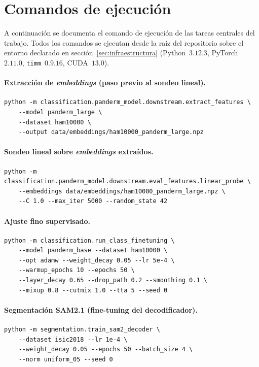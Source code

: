 \section{Comandos de ejecución}
\label{sec:anexoa-comandos}

A continuación se documenta el comando de ejecución de las
tareas centrales del trabajo. Todos los comandos se ejecutan
desde la raíz del repositorio sobre el entorno declarado en
sección~\ref{sec:infraestructura} (Python~$3.12.3$, PyTorch~$2.11.0$,
\texttt{timm}~$0.9.16$, CUDA~$13.0$).

\paragraph{Extracción de \emph{embeddings} (paso previo al sondeo
lineal).}
{\footnotesize\begin{verbatim}
python -m classification.panderm_model.downstream.extract_features \
    --model panderm_large \
    --dataset ham10000 \
    --output data/embeddings/ham10000_panderm_large.npz
\end{verbatim}}

\paragraph{Sondeo lineal sobre \emph{embeddings} extraídos.}
{\footnotesize\begin{verbatim}
python -m classification.panderm_model.downstream.eval_features.linear_probe \
    --embeddings data/embeddings/ham10000_panderm_large.npz \
    --C 1.0 --max_iter 5000 --random_state 42
\end{verbatim}}

\paragraph{Ajuste fino supervisado.}
{\footnotesize\begin{verbatim}
python -m classification.run_class_finetuning \
    --model panderm_base --dataset ham10000 \
    --opt adamw --weight_decay 0.05 --lr 5e-4 \
    --warmup_epochs 10 --epochs 50 \
    --layer_decay 0.65 --drop_path 0.2 --smoothing 0.1 \
    --mixup 0.8 --cutmix 1.0 --tta 5 --seed 0
\end{verbatim}}

\paragraph{Segmentación SAM2.1 (fine-tuning del decodificador).}
{\footnotesize\begin{verbatim}
python -m segmentation.train_sam2_decoder \
    --dataset isic2018 --lr 1e-4 \
    --weight_decay 0.05 --epochs 50 --batch_size 4 \
    --norm uniform_05 --seed 0
\end{verbatim}}

